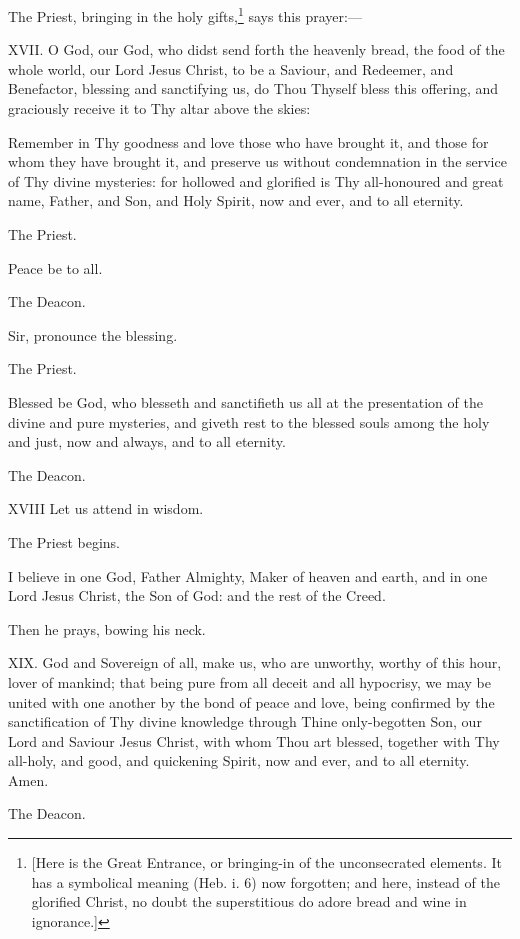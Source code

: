 The Priest, bringing in the holy gifts,\footnote{\par{}  [Here is the Great Entrance, or bringing-in of the unconsecrated elements. It has a symbolical meaning (Heb. i. 6) now forgotten; and here, instead of the glorified Christ, no doubt the superstitious do adore bread and wine in ignorance.]} says this prayer:—

XVII. O God, our God, who didst send forth the heavenly bread, the food of the whole world, our Lord Jesus Christ, to be a Saviour, and Redeemer, and Benefactor, blessing and sanctifying us, do Thou Thyself bless this offering, and graciously receive it to Thy altar above the skies:

Remember in Thy goodness and love those who have brought it, and those for whom they have brought it, and preserve us without condemnation in the service of Thy divine mysteries: for hollowed and glorified is Thy all-honoured and great name, Father, and Son, and Holy Spirit, now and ever, and to all eternity.

The Priest.

Peace be to all.

The Deacon.

Sir, pronounce the blessing.

The Priest.

Blessed be God, who blesseth and sanctifieth us all at the presentation of the divine and pure mysteries, and giveth rest to the blessed souls among the holy and just, now and always, and to all eternity.

The Deacon.

\textsc{XVIII} Let us attend in wisdom.

The Priest begins.

I believe in one God, Father Almighty, Maker of heaven and earth, and in one Lord Jesus Christ, the Son of God: and the rest of the Creed.

Then he prays, bowing his neck.

XIX. God and Sovereign of all, make us, who are unworthy, worthy of this hour, lover of mankind; that being pure from all deceit and all hypocrisy, we may be united with one another by the bond of peace and love, being confirmed by the sanctification of Thy divine knowledge through Thine only-begotten Son, our Lord and Saviour Jesus Christ, with whom Thou art blessed, together with Thy all-holy, and good, and quickening Spirit, now and ever, and to all eternity. Amen.

The Deacon.

